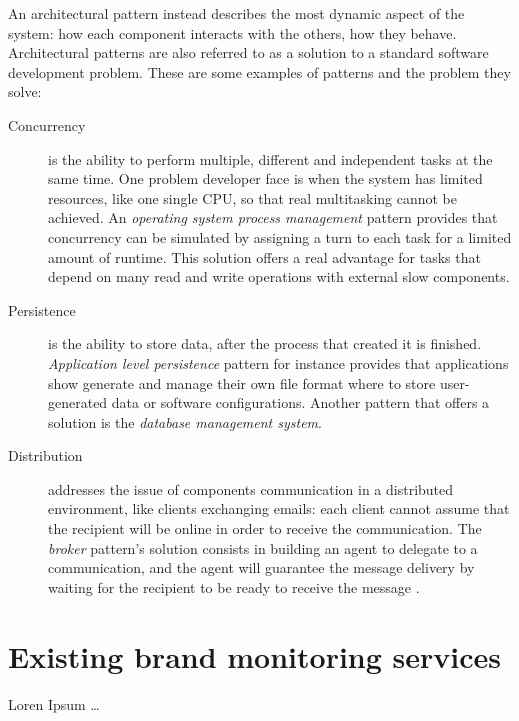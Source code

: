 An architectural pattern instead describes the most dynamic aspect of the
system: how each component interacts with the others, how they behave.
Architectural patterns are also referred to as a solution to a standard software
development problem. These are some examples of patterns and the problem they
solve:
\begin{description}
\item[Concurrency] is the ability to perform multiple, different and
independent tasks at the same time. One problem developer face is when the
system has limited resources, like one single CPU, so that real multitasking
cannot be achieved. An \emph{operating system process management} pattern
provides that concurrency can be simulated by assigning a turn to each task for
a limited amount of runtime. This solution offers a real advantage for tasks
that depend on many read and write operations with external slow components.
\item[Persistence] is the ability to store data, after the process that created
it is finished. \emph{Application level persistence} pattern for instance
provides that applications show generate and manage their own file format where
to store user-generated data or software configurations. Another pattern that
offers a solution is the \emph{database management system}.
\item[Distribution] addresses the issue of components communication in a
distributed environment, like clients exchanging emails: each client cannot
assume that the recipient will be online in order to receive the communication.
The \emph{broker} pattern's solution consists in building an agent to delegate
to a communication, and the agent will guarantee the message delivery by waiting
for the recipient to be ready to receive the message \cite{JB00}.
\end{description}

\section{Existing brand monitoring services}
Loren Ipsum \ldots